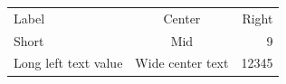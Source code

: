 \documentclass{article}
\begin{document}
\begin{tabular}{lcr}
Label & Center & Right\\
Short & Mid & 9\\
Long left text value & Wide center text & 12345\\
\end{tabular}
\end{document}
